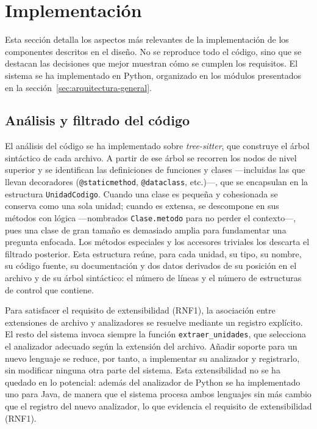 \section{Implementación}
\label{sec:implementacion}

Esta sección detalla los aspectos más relevantes de la implementación de
los componentes descritos en el diseño. No se reproduce todo el
código, sino que se destacan las decisiones que mejor
muestran cómo se cumplen los requisitos. El sistema se ha
implementado en Python, organizado en los módulos presentados en la
sección~\ref{sec:arquitectura-general}.

\subsection{Análisis y filtrado del código}
\label{sec:impl-parser}

El análisis del código se ha implementado sobre \emph{tree-sitter}, que
construye el árbol sintáctico de cada archivo. A partir de ese árbol se
recorren los nodos de nivel superior y se identifican las definiciones de
funciones y clases ---incluidas las que llevan decoradores
(\texttt{@staticmethod}, \texttt{@dataclass}, etc.)---, que se
encapsulan en la estructura \texttt{UnidadCodigo}. Cuando una clase es pequeña
y cohesionada se conserva como una sola unidad; cuando es extensa, se descompone
en sus métodos con lógica ---nombrados \texttt{Clase.metodo} para no perder el
contexto---, pues una clase de gran tamaño es demasiado amplia para fundamentar
una pregunta enfocada. Los métodos especiales y los accesores triviales los
descarta el filtrado posterior. Esta estructura reúne,
para cada unidad, su tipo, su nombre, su código fuente, su documentación y
dos datos derivados de su posición en el archivo y de su árbol sintáctico:
el número de líneas y el número de estructuras de control que contiene.

Para satisfacer el requisito de extensibilidad (RNF1), la asociación entre
extensiones de archivo y analizadores se resuelve mediante un registro
explícito. El resto del sistema invoca siempre la función
\texttt{extraer\_unidades}, que selecciona el analizador adecuado según la
extensión del archivo. Añadir soporte para un nuevo lenguaje se reduce, por
tanto, a implementar su analizador y registrarlo, sin modificar ninguna
otra parte del sistema. Esta extensibilidad no se ha quedado en lo potencial:
además del analizador de Python se ha implementado uno para Java, de manera que
el sistema procesa ambos lenguajes sin más cambio que el registro del nuevo
analizador, lo que evidencia el requisito de extensibilidad (RNF1).

